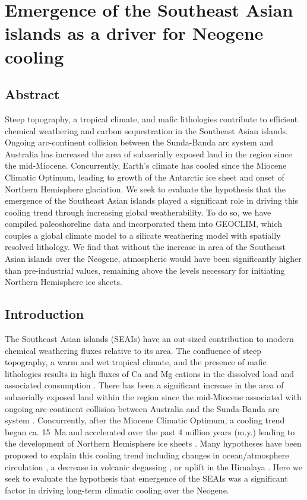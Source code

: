 \chapter[Emergence of the Southeast Asian islands as a driver for Neogene cooling][Southeast Asian islands]{Emergence of the Southeast Asian islands as a driver for Neogene cooling}

\section{Abstract}

Steep topography, a tropical climate, and mafic lithologies contribute to efficient chemical weathering and carbon sequestration in the Southeast Asian islands. Ongoing arc-continent collision between the Sunda-Banda arc system and Australia has increased the area of subaerially exposed land in the region since the mid-Miocene. Concurrently, Earth's climate has cooled since the Miocene Climatic Optimum, leading to growth of the Antarctic ice sheet and onset of Northern Hemisphere glaciation. We seek to evaluate the hypothesis that the emergence of the Southeast Asian islands played a significant role in driving this cooling trend through increasing global weatherability. To do so, we have compiled paleoshoreline data and incorporated them into GEOCLIM, which couples a global climate model to a silicate weathering model with spatially resolved lithology. We find that without the increase in area of the Southeast Asian islands over the Neogene, atmospheric \pCOtwo would have been significantly higher than pre-industrial values, remaining above the levels necessary for initiating Northern Hemisphere ice sheets.

\section{Introduction}

The Southeast Asian islands (SEAIs) have an out-sized contribution to modern chemical weathering fluxes relative to its area. The confluence of steep topography, a warm and wet tropical climate, and the presence of mafic lithologies results in high fluxes of Ca and Mg cations in the dissolved load and associated \COtwo consumption \citep{Gaillardet1999a, Hartmann2009a, Milliman2013a, Hartmann2014a}. There has been a significant increase in the area of subaerially exposed land within the region since the mid-Miocene associated with ongoing arc-continent collision between Australia and the Sunda-Banda arc system \citep{Molnar2015a, Hall2017a, Macdonald2019a}. Concurrently, after the Miocene Climatic Optimum, a cooling trend began ca. 15~Ma and accelerated over the past 4 million years (m.y.) leading to the development of Northern Hemisphere ice sheets \citep{Shackleton1984a, Zachos2001a}. Many hypotheses have been proposed to explain this cooling trend including changes in ocean/atmosphere circulation \citep{Haug1998a, Shevenell2004a, Molnar2015a}, a decrease in volcanic degassing \citep{Berner1983a}, or uplift in the Himalaya \citep{Raymo1988a, Galy2007a}. Here we seek to evaluate the hypothesis that emergence of the SEAIs was a significant factor in driving long-term climatic cooling over the Neogene.

